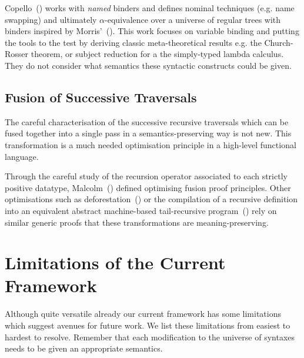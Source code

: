 Copello~(\citeyear{copello2017}) works with \emph{named} binders and
defines nominal techniques (e.g. name swapping) and ultimately
$\alpha$-equivalence over a universe of regular trees with binders
inspired by Morris'~(\citeyear{morris-regulartt}).
%
This work focuses on variable binding and putting the tools to the test by
deriving classic meta-theoretical results e.g. the Church-Rosser theorem,
or subject reduction for a the simply-typed lambda calculus.
%
They do not consider what semantics these syntactic constructs could be given.

\subsection{Fusion of Successive Traversals}

The careful characterisation of the successive recursive traversals which can be
fused together into a single pass in a semantics-preserving way is not new. This
transformation is a much needed optimisation principle in a high-level
functional language.

Through the careful study of the recursion operator associated to each
strictly positive datatype,
Malcolm~(\citeyear{DBLP:journals/scp/Malcolm90}) defined optimising
fusion proof principles.
%
Other optimisations such as deforestation~(\cite{DBLP:journals/tcs/Wadler90})
or the compilation of a recursive definition into an equivalent abstract
machine-based tail-recursive program~(\cite{DBLP:conf/icfp/CortinasS18})
rely on similar generic proofs that these transformations are
meaning-preserving.


\section{Limitations of the Current Framework}

Although quite versatile already our current framework has some limitations
which suggest avenues for future work. We list these limitations from easiest
to hardest to resolve. Remember that each modification to the universe of
syntaxes needs to be given an appropriate semantics.

